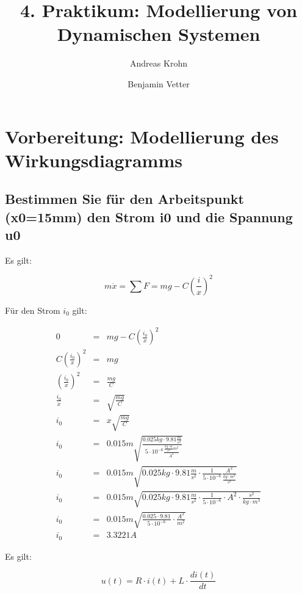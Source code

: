 \documentclass[a4paper,10pt,left=1.5cm,right=1.5cm,top=1.5cm,bottom=1.5cm]{article}
\title{4. Praktikum: Modellierung von Dynamischen Systemen}
\author{Andreas Krohn \and Benjamin Vetter}
\begin{document}
\maketitle

\tableofcontents

\section{Vorbereitung: Modellierung des Wirkungsdiagramms}

\subsection{Bestimmen Sie für den Arbeitspunkt (x0=15mm) den Strom i0 und die Spannung u0}

Es gilt:

\begin{equation}
  m\ddot{x}=\sum F=mg-C\left(\frac{i}{x}\right)^2
\end{equation}

Für den Strom $i_0$ gilt:

\begin{eqnarray*}
  0 &=& mg-C\left(\frac{i_0}{x}\right)^2 \\
  C\left(\frac{i_0}{x}\right)^2 &=& mg \\
  \left(\frac{i_0}{x}\right)^2 &=& \frac{mg}{C} \\
  \frac{i_0}{x} &=& \sqrt{\frac{mg}{C}} \\
  i_0 &=& x\sqrt{\frac{mg}{C}} \\
  i_0 &=& 0.015m \sqrt{\frac{0.025kg \cdot 9.81 \frac{m}{s^2}}{5 \cdot 10^{-6} \frac{\frac{kg \cdot m}{s^2} m^2}{A^2}}} \\
  i_0 &=& 0.015m \sqrt{0.025kg \cdot 9.81 \frac{m}{s^2} \cdot \frac{1}{5 \cdot 10^{-6}} \frac{A^2}{\frac{kg \cdot m^3}{s^2}}} \\
  i_0 &=& 0.015m \sqrt{0.025kg \cdot 9.81 \frac{m}{s^2} \cdot \frac{1}{5 \cdot 10^{-6}} \cdot A^2 \cdot \frac{s^2}{kg \cdot m^3}} \\
  i_0 &=& 0.015m \sqrt{\frac{0.025 \cdot 9.81}{5 \cdot 10^{-6}} \cdot \frac{A^2}{m^2}} \\
  i_0 &=& 3.3221 A
\end{eqnarray*}

Es gilt:

\begin{equation}
  u(t) = R \cdot i(t) + L \cdot \frac{di(t)}{dt}
\end{equation}
\end{document}
